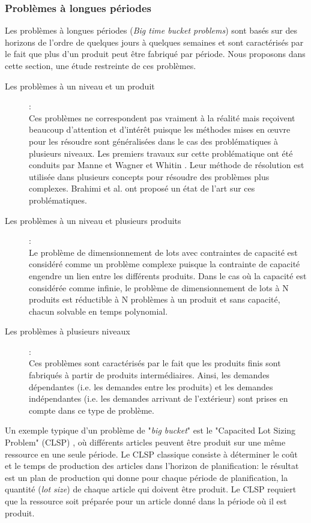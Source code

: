 \documentclass[12pt,a4paper]{article}
\begin{document}
	\subsubsection{Problèmes à longues périodes}
	Les problèmes à longues périodes (\emph{Big time bucket problems}) sont basés sur des
horizons de l'ordre de quelques jours à quelques semaines et sont caractérisés par le fait que plus d'un produit peut être fabriqué par période. Nous proposons dans cette section, une étude restreinte de ces problèmes.
	
	\begin{description}
		\item[Les problèmes à un niveau et un produit]: \\
		Ces problèmes ne correspondent pas vraiment à la réalité mais reçoivent beaucoup d'attention et d'intérêt puisque les méthodes mises en œuvre pour les résoudre sont généralisées dans le cas des problématiques à plusieurs niveaux.
		Les premiers travaux sur cette problématique ont été conduits par Manne \cite{manne}
et Wagner et Whitin \cite{wagner_whitin}. Leur méthode de résolution est utilisée dans plusieurs
concepts pour résoudre des problèmes plus complexes. Brahimi et al. \cite{brahimi} ont proposé
un état de l'art sur ces problématiques.		
		\item[Les problèmes à un niveau et plusieurs produits]: \\
		Le problème de dimensionnement de lots avec contraintes de capacité est considéré comme un problème complexe puisque la contrainte de capacité engendre un
lien entre les différents produits. Dans le cas où la capacité est considérée comme
infinie, le problème de dimensionnement de lots à N produits est réductible à N
problèmes à un produit et sans capacité, chacun solvable en temps polynomial.
		\item[Les problèmes à plusieurs niveaux]: \\ 
		Ces problèmes sont caractérisés par le fait que les produits finis sont fabriqués à partir de produits intermédiaires. Ainsi, les demandes dépendantes (i.e. les demandes entre les produits) et les demandes indépendantes (i.e. les demandes arrivant de l'extérieur) sont prises en compte dans ce type de problème.
	\end{description}
	
	Un exemple typique d'un problème de "\emph{big bucket}" est le "Capacited Lot Sizing Problem" (CLSP) , où différents articles peuvent être produit sur une même ressource en une seule période. Le CLSP classique consiste à déterminer le coût et le temps de production des articles dans l'horizon de planification: le résultat est un plan de production qui donne pour chaque période de planification, la quantité (\emph{lot size}) de chaque article qui doivent être produit. Le CLSP requiert que la ressource soit préparée pour un article donné dans la période où il est produit. 
	
\end{document}
